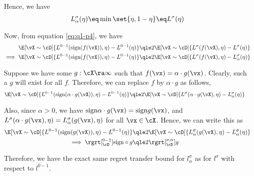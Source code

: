 \documentclass[a4paper,10pt]{article}
\begin{document}
\begin{question}
\begin{qpart}{5}
		Hence, we have
		\begin{align*}
			L_\alpha^\sigma(\eta)	\eq	\min\set{\eta, 1 - \eta}	\eq	L^\sigma(\eta)
		\end{align*}

		Now, from equation \ref{eq:q1-p4}, we have
		\begin{align*}
			\E[\vX \sim \cD]{L^{0-1}(\sgn(f(\vX)), \eta) - L^{0-1}(\eta)}	&\qle	2 \E[\vX \sim \cD]{L^{\sigma}(f(\vX), \eta) - L^{\sigma}(\eta)} \\
			\implies \E[\vX \sim \cD]{L^{0-1}(\sgn(f(\vX)), \eta) - L^{0-1}(\eta)}	&\qle	2 \E[\vX \sim \cD]{L^{\sigma}(f(\vX), \eta) - L_\alpha^{\sigma}(\eta)}
		\end{align*}

		Suppose we have some $g : \cX \ra \infty$ such that $f(\vx) = \alpha \cdot g(\vx)$. Clearly, such a $g$ will exist for all $f$. Therefore, we can replace $f$ by $\alpha \cdot g$ as follows,
		\begin{align*}
			\E[\vX \sim \cD]{L^{0-1}(\sgn(\alpha \cdot g(\vX)), \eta) - L^{0-1}(\eta)}	&\qle	2 \E[\vX \sim \cD]{L^{\sigma}(\alpha \cdot g(\vX), \eta) - L_\alpha^{\sigma}(\eta)}
		\end{align*}

		Also, since $\alpha > 0$, we have $\sgn{\alpha \cdot g(\vx)} = \sgn{g(\vx)}$, and $L^\sigma(\alpha \cdot g(\vx), \eta) = L_\alpha^\sigma(g(\vx), \eta)$ for all $\vx \in \cX$. Hence, we can write this as
		\begin{align*}
			\E[\vX \sim \cD]{L^{0-1}(\sgn(g(\vX)), \eta) - L^{0-1}(\eta)}	&\qle	2 \E[\vX \sim \cD]{L_\alpha^{\sigma}(g(\vX), \eta) - L_\alpha^{\sigma}(\eta)} \\
			\implies \rgrt[_\cD^{0-1}]{\text{sign} \circ g}	&\qle	2 \rgrt[_\cD^{\sigma, \alpha}]{g}
		\end{align*}

		Therefore, we have the exact same regret transfer bound for $l_\alpha^\sigma$ as for $l^\sigma$ with respect to $l^{0-1}$.

	\end{qpart}

\end{question}
\end{document}
